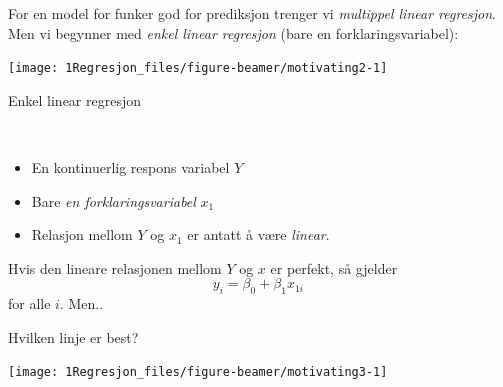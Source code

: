 \documentclass[10pt,ignorenonframetext,]{beamer}
\begin{document}
\begin{frame}

For en model for funker god for prediksjon trenger vi \emph{multippel
linear regresjon}. Men vi begynner med \emph{enkel linear regresjon}
(bare en forklaringsvariabel):

\begin{center}\texttt{[image: 1Regresjon\_files/figure-beamer/motivating2-1]} \end{center}

\end{frame}

\begin{frame}{Enkel linear regresjon}
\protect\hypertarget{enkel-linear-regresjon}{}

\(~\)

\begin{itemize}
\item
  En kontinuerlig respons variabel \(Y\)
\item
  Bare \emph{en forklaringsvariabel} \(x_1\)
\item
  Relasjon mellom \(Y\) og \(x_1\) er antatt å være \emph{linear}.
\end{itemize}

\vspace{6mm}

Hvis den lineare relasjonen mellom \(Y\) og \(x\) er perfekt, så gjelder
\[y_i = \beta_0 + \beta_1 x_{1i}\ \] for alle \(i\). Men..

\end{frame}

\begin{frame}

Hvilken linje er best?

\begin{center}\texttt{[image: 1Regresjon\_files/figure-beamer/motivating3-1]} \end{center}

\end{frame}
\end{document}

